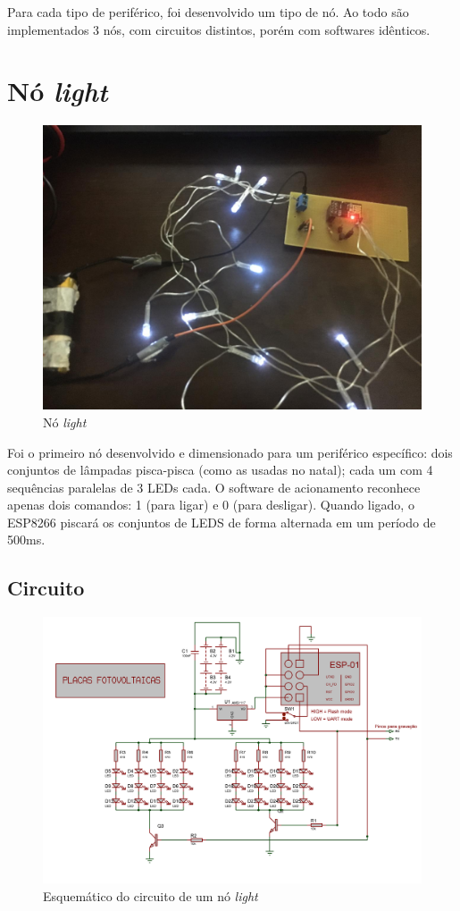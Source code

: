\documentclass[
12pt,				%
openany,			%
twoside,			%
a4paper,			%
english,			%
french,				%
spanish,			%
brazil,				%
]{abntex2}
\begin{document}
Para cada tipo de periférico, foi desenvolvido um tipo de nó. Ao todo são implementados 3 nós, com circuitos distintos, porém com softwares idênticos.

\section{Nó \textit{light}}
\begin{figure}[ht!]
    \centering
    \includegraphics[width=350pt]{images/light.jpeg}
    \caption{Nó \textit{light}}
\end{figure}
Foi o primeiro nó desenvolvido e dimensionado para um periférico específico: dois conjuntos de lâmpadas pisca-pisca (como as usadas no natal); cada um com 4 sequências paralelas de 3 LEDs cada. O software de acionamento reconhece apenas dois comandos: 1 (para ligar) e 0 (para desligar). Quando ligado, o ESP8266 piscará os conjuntos de LEDS de forma alternada em um período de 500ms.
\subsection{Circuito}
\begin{figure}[ht!]
    \includegraphics[width=450pt]{images/circuit.png}
    \caption{Esquemático do circuito de um nó \textit{light}}
\end{figure}
\end{document}
